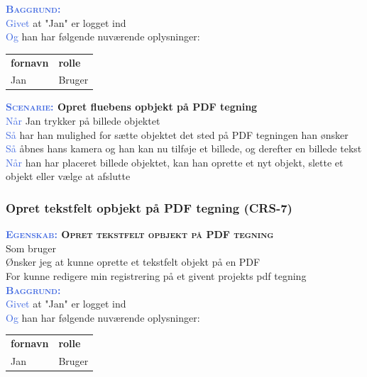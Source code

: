 \textsc{\textcolor{RoyalBlue}{\textbf{Baggrund:}}}\\
\textcolor{RoyalBlue}{Givet} at "Jan" er logget ind\\
\textcolor{RoyalBlue}{Og} han har følgende nuværende oplysninger:\\
\begin{tabular}{| l | l |}
	\textbf{fornavn} & \textbf{rolle} \\
	Jan & Bruger\\
\end{tabular}

\textbf{\textsc{\textcolor{RoyalBlue}{Scenarie:}} Opret fluebens opbjekt på PDF tegning}\\
\textcolor{RoyalBlue}{Når} Jan trykker på billede objektet\\
\textcolor{RoyalBlue}{Så}  har han mulighed for sætte objektet det sted på PDF tegningen han ønsker\\
\textcolor{RoyalBlue}{Så}  åbnes hans kamera og han kan nu tilføje et billede, og derefter en billede tekst\\
\textcolor{RoyalBlue}{Når} han har placeret billede objektet, kan han oprette et nyt objekt, slette et objekt eller vælge at afslutte \\

\subsubsection{Opret tekstfelt opbjekt på PDF tegning (CRS-7)} \label{sec:USOpretTekstfelt}
\textbf{\textsc{\textcolor{RoyalBlue}{Egenskab:} Opret tekstfelt opbjekt på PDF tegning}}\\
Som bruger\\
Ønsker jeg at kunne oprette et tekstfelt objekt på en PDF\\
For kunne redigere min registrering på et givent projekts pdf tegning\\

\textsc{\textcolor{RoyalBlue}{\textbf{Baggrund:}}}\\
\textcolor{RoyalBlue}{Givet} at "Jan" er logget ind\\
\textcolor{RoyalBlue}{Og} han har følgende nuværende oplysninger:\\
\begin{tabular}{| l | l |}
	\textbf{fornavn} & \textbf{rolle} \\
	Jan & Bruger\\
\end{tabular}

